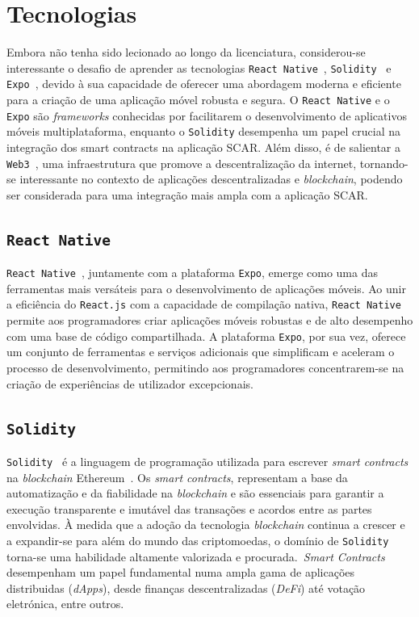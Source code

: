 \documentclass[10pt]{article}
\begin{document}
\section*{Tecnologias}

Embora não tenha sido lecionado ao longo da licenciatura, considerou-se interessante o desafio de aprender
as tecnologias \texttt{React Native}~\cite{ReactNativeBook}, \texttt{Solidity}~\cite{SolidityBook} e \texttt{Expo}~\cite{Expo},
devido à sua capacidade de oferecer uma abordagem moderna e eficiente para a criação de uma aplicação móvel robusta e segura.
O \texttt{React Native} e o \texttt{Expo} são \textit{frameworks} conhecidas por facilitarem o desenvolvimento de aplicativos móveis multiplataforma,
enquanto o \texttt{Solidity} desempenha um papel crucial na integração dos smart contracts na aplicação SCAR\@.
Além disso, é de salientar a \texttt{Web3}~\cite{Web3}, uma infraestrutura que promove a descentralização da internet, tornando-se interessante no contexto de
aplicações descentralizadas e \textit{blockchain}, podendo ser considerada para uma integração mais ampla com a aplicação SCAR\@.

\subsection*{\texttt{React Native}}

\texttt{React Native}~\cite{ReactNativeDocs}, juntamente com a plataforma \texttt{Expo}, emerge como uma das ferramentas mais versáteis
para o desenvolvimento de aplicações móveis. Ao unir a eficiência do \texttt{React.js} com a capacidade de compilação
nativa, \texttt{React Native} permite aos programadores criar aplicações móveis robustas e de alto desempenho
com uma base de código compartilhada. A plataforma \texttt{Expo}, por sua vez, oferece um conjunto de ferramentas
e serviços adicionais que simplificam e aceleram o processo de desenvolvimento, permitindo aos programadores
concentrarem-se na criação de experiências de utilizador excepcionais.

\subsection*{\texttt{Solidity}}

\texttt{Solidity}~\cite{SolidityDocs} é a linguagem de programação utilizada para escrever \textit{smart contracts} na \textit{blockchain} Ethereum~\cite{Ethereum}.
Os \textit{smart contracts}, representam a base da automatização e da fiabilidade na \textit{blockchain} e são essenciais
para garantir a execução transparente e imutável das transações e acordos entre as partes envolvidas.
À medida que a adoção da tecnologia \textit{blockchain} continua a crescer e a expandir-se para além do mundo das criptomoedas, o domínio de \texttt{Solidity} torna-se
uma habilidade altamente valorizada e procurada.\ \textit{Smart Contracts} desempenham um papel fundamental numa
ampla gama de aplicações distribuidas (\textit{dApps}), desde finanças descentralizadas (\textit{DeFi}) até votação eletrónica, entre outros.
\end{document}
